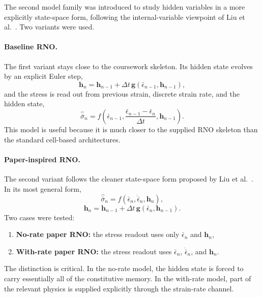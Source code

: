 \documentclass[11pt,a4paper]{article}
\newcommand{\epsbar}{\bar{\epsilon}}
\newcommand{\sigbar}{\bar{\sigma}}
\newcommand{\dt}{\Delta t}
\begin{document}
The second model family was introduced to study hidden variables in a more explicitly state-space form, following the internal-variable viewpoint of Liu et al.~\cite{Liu_2023}. Two variants were used.

\paragraph{Baseline RNO.}
The first variant stays close to the coursework skeleton. Its hidden state evolves by an explicit Euler step,
\begin{equation}
\bm{h}_n=\bm{h}_{n-1}+\dt\,\bm{g}\!\left(\epsbar_{n-1},\bm{h}_{n-1}\right),
\label{eq:baseline_state_update}
\end{equation}
and the stress is read out from previous strain, discrete strain rate, and the hidden state,
\begin{equation}
\hat{\sigbar}_n=f\!\left(\epsbar_{n-1},\frac{\epsbar_{n-1}-\epsbar_n}{\dt},\bm{h}_{n-1}\right).
\label{eq:baseline_readout}
\end{equation}
This model is useful because it is much closer to the supplied RNO skeleton than the standard cell-based architectures.

\paragraph{Paper-inspired RNO.}
The second variant follows the cleaner state-space form proposed by Liu et al.~\cite{Liu_2023}. In its most general form,
\begin{equation}
\hat{\sigbar}_n=f\!\left(\epsbar_n,\dot{\epsbar}_n,\bm{h}_{n}\right),
\label{eq:paper_stress_relation}
\end{equation}
\begin{equation}
\bm{h}_{n}=\bm{h}_{n-1}+\dt\,\bm{g}\!\left(\epsbar_n,\bm{h}_{n-1}\right).
\label{eq:paper_kinetic_relation}
\end{equation}
Two cases were tested:
\begin{enumerate}[leftmargin=1.5em]
    \item \textbf{No-rate paper RNO:} the stress readout uses only $\epsbar_n$ and $\bm{h}_n$,
    \item \textbf{With-rate paper RNO:} the stress readout uses $\epsbar_n$, $\dot{\epsbar}_n$, and $\bm{h}_n$.
\end{enumerate}
The distinction is critical. In the no-rate model, the hidden state is forced to carry essentially all of the constitutive memory. In the with-rate model, part of the relevant physics is supplied explicitly through the strain-rate channel.
\end{document}
